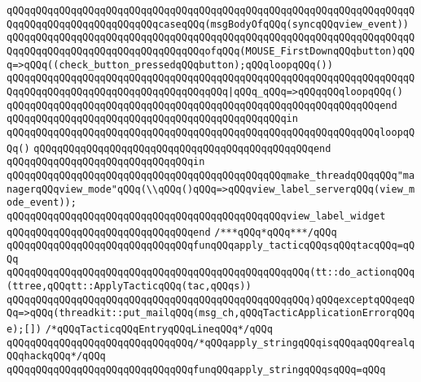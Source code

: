 \verb|qQQqqQQqqQQqqQQqqQQqqQQqqQQqqQQqqQQqqQQqqQQqqQQqqQQqqQQqqQQqqQQqqQQqqQQqqQQqqQQqqQQqqQQqqQQqqQQqcaseqQQq(msgBodyOfqQQq(syncqQQqview_event))|\newline
\verb|qQQqqQQqqQQqqQQqqQQqqQQqqQQqqQQqqQQqqQQqqQQqqQQqqQQqqQQqqQQqqQQqqQQqqQQqqQQqqQQqqQQqqQQqqQQqqQQqqQQqqQQqofqQQq(MOUSE_FirstDownqQQqbutton)qQQq=>qQQq((check_button_pressedqQQqbutton);qQQqloopqQQq())|\newline
\verb|qQQqqQQqqQQqqQQqqQQqqQQqqQQqqQQqqQQqqQQqqQQqqQQqqQQqqQQqqQQqqQQqqQQqqQQqqQQqqQQqqQQqqQQqqQQqqQQqqQQqqQQqqQQq|\verb#|qQQq_qQQq=>qQQqqQQqloopqQQq()#\newline
\verb|qQQqqQQqqQQqqQQqqQQqqQQqqQQqqQQqqQQqqQQqqQQqqQQqqQQqqQQqqQQqqQQqend|\newline
\verb|qQQqqQQqqQQqqQQqqQQqqQQqqQQqqQQqqQQqqQQqqQQqqQQqin|\newline
\verb|qQQqqQQqqQQqqQQqqQQqqQQqqQQqqQQqqQQqqQQqqQQqqQQqqQQqqQQqqQQqqQQqloopqQQq()|\newline
\verb|qQQqqQQqqQQqqQQqqQQqqQQqqQQqqQQqqQQqqQQqqQQqqQQqend|\newline
\verb|qQQqqQQqqQQqqQQqqQQqqQQqqQQqqQQqin|\newline
\verb|qQQqqQQqqQQqqQQqqQQqqQQqqQQqqQQqqQQqqQQqqQQqqQQqmake_threadqQQqqQQq"managerqQQqview_mode"qQQq(\\qQQq()qQQq=>qQQqview_label_serverqQQq(view_mode_event));|\newline
\verb|qQQqqQQqqQQqqQQqqQQqqQQqqQQqqQQqqQQqqQQqqQQqqQQqview_label_widget|\newline
\verb|qQQqqQQqqQQqqQQqqQQqqQQqqQQqqQQqend|\newline
\verb|/***qQQq*qQQq***/qQQq|\newline
\newline
\verb|qQQqqQQqqQQqqQQqqQQqqQQqqQQqqQQqfunqQQqapply_tacticqQQqsqQQqtacqQQq=qQQq|\newline
\verb|qQQqqQQqqQQqqQQqqQQqqQQqqQQqqQQqqQQqqQQqqQQqqQQqqQQq(tt::do_actionqQQq(ttree,qQQqtt::ApplyTacticqQQq(tac,qQQqs))|\newline
\verb|qQQqqQQqqQQqqQQqqQQqqQQqqQQqqQQqqQQqqQQqqQQqqQQqqQQq)qQQqexceptqQQqeqQQq=>qQQq(threadkit::put_mailqQQq(msg_ch,qQQqTacticApplicationErrorqQQqe);[])|\newline
\newline
\verb|/*qQQqTacticqQQqEntryqQQqLineqQQq*/qQQq|\newline
\verb|qQQqqQQqqQQqqQQqqQQqqQQqqQQqqQQq/*qQQqapply_stringqQQqisqQQqaqQQqrealqQQqhackqQQq*/qQQq|\newline
\verb|qQQqqQQqqQQqqQQqqQQqqQQqqQQqqQQqfunqQQqapply_stringqQQqsqQQq=qQQq|\newline
